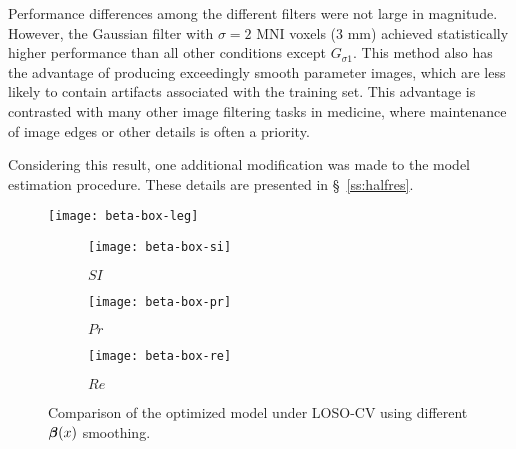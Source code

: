 Performance differences among the different filters were not large in magnitude.
However, the Gaussian filter with $\sigma = 2$ MNI voxels (3 mm)
achieved statistically higher performance than all other conditions except $G_{\sigma1}$.
This method also has the advantage of producing exceedingly smooth parameter images,
which are less likely to contain artifacts associated with the training set.
This advantage is contrasted with many other image filtering tasks in medicine,
where maintenance of image edges or other details is often a priority.
\par
Considering this result, one additional modification was made
to the model estimation procedure.
These details are presented in \S~\ref{ss:halfres}.
\begin{figure}
  \centering
  \texttt{[image: beta-box-leg]}\\[0.5em]
  \begin{subfigure}{0.32\textwidth}
    \centering\texttt{[image: beta-box-si]}
    \caption{$SI$}%
    \label{fig:seg-box-beta-si}
  \end{subfigure}
  \begin{subfigure}{0.32\textwidth}
    \centering\texttt{[image: beta-box-pr]}
    \caption{$Pr$}%
    \label{fig:seg-box-beta-pr}
  \end{subfigure}
  \begin{subfigure}{0.32\textwidth}
    \centering\texttt{[image: beta-box-re]}
    \caption{$Re$}%
    \label{fig:seg-box-lambeta-re}
  \end{subfigure}
  \caption{Comparison of the optimized model under LOSO-CV
    using different $\bm{\beta}(x)$ smoothing.}%
  \label{fig:seg-beta-lam}
\end{figure}
